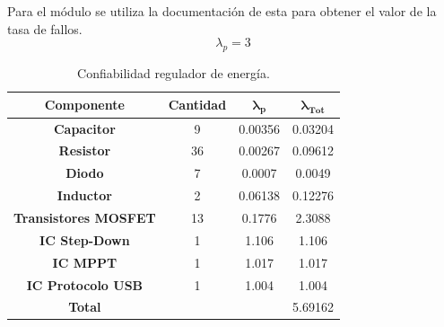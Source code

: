 \Subsubsection{\rspi}
Para el módulo \rspi se utiliza la documentación de esta para obtener el valor de la tasa de fallos.
\begin{equation}
\lambda_p = 3 
\end{equation}
\begin{table}[H]
\centering
\begin{tabular}{|c|ccc|}
\hline
\textbf{Componente}          & \multicolumn{1}{c|}{\textbf{Cantidad}} & \multicolumn{1}{c|}{$\boldsymbol{\lambda_p}$}        & $\boldsymbol{\lambda_{Tot}}$ \\ \hline
\textbf{Capacitor}           & \multicolumn{1}{c|}{9}                 & \multicolumn{1}{c|}{\cellcolor[HTML]{FFFFFF}0.00356} & 0.03204                      \\ \hline
\textbf{Resistor}            & \multicolumn{1}{c|}{36}                & \multicolumn{1}{c|}{\cellcolor[HTML]{FFFFFF}0.00267} & 0.09612                      \\ \hline
\textbf{Diodo}               & \multicolumn{1}{c|}{7}                 & \multicolumn{1}{c|}{\cellcolor[HTML]{FFFFFF}0.0007}  & 0.0049                       \\ \hline
\textbf{Inductor}            & \multicolumn{1}{c|}{2}                 & \multicolumn{1}{c|}{0.06138}                         & 0.12276                      \\ \hline
\textbf{Transistores MOSFET} & \multicolumn{1}{c|}{13}                & \multicolumn{1}{c|}{0.1776}                          & 2.3088                       \\ \hline
\textbf{IC Step-Down}        & \multicolumn{1}{c|}{1}                 & \multicolumn{1}{c|}{1.106}                           & 1.106                        \\ \hline
\textbf{IC MPPT}             & \multicolumn{1}{c|}{1}                 & \multicolumn{1}{c|}{1.017}                           & 1.017                        \\ \hline
\textbf{IC Protocolo USB}    & \multicolumn{1}{c|}{1}                 & \multicolumn{1}{c|}{1.004}                           & 1.004                        \\ \hline
\textbf{Total}               & \multicolumn{1}{l}{}                   & \multicolumn{1}{l}{}                                 & \multicolumn{1}{r|}{5.69162} \\ \hline
\end{tabular}
\caption{Confiabilidad regulador de energía.}
\label{confReg}
\end{table}

